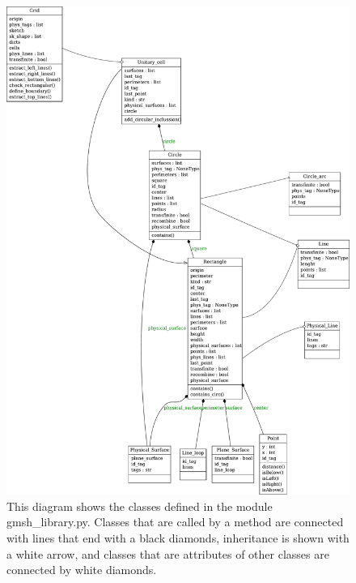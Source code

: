 \begin{figure}
\centering
\includegraphics[scale=0.33]{./img/gmsh_library.pdf}
\caption{This diagram shows the classes defined in the module gmsh\_library.py. Classes that are called by a method are connected with lines that end with a black diamonds, inheritance is shown with a white arrow, and classes that are attributes of other classes are connected by white diamonds.}
\label{fig:gmsh_library_classes}
\end{figure}

